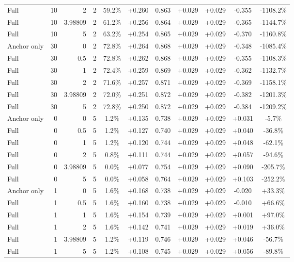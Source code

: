 \begin{table}[htbp]
\begin{tabular}{lrrrccccccc}
Full & 10 & 2 & 2 & 59.2\% & +0.260 & 0.863 & +0.029 & +0.029 & -0.355 & -1108.2\% \\
Full & 10 & 3.98809 & 2 & 61.2\% & +0.256 & 0.864 & +0.029 & +0.029 & -0.365 & -1144.7\% \\
Full & 10 & 5 & 2 & 63.2\% & +0.254 & 0.865 & +0.029 & +0.029 & -0.370 & -1160.8\% \\
Anchor only & 30 & 0 & 2 & 72.8\% & +0.264 & 0.868 & +0.029 & +0.029 & -0.348 & -1085.4\% \\
Full & 30 & 0.5 & 2 & 72.8\% & +0.262 & 0.868 & +0.029 & +0.029 & -0.355 & -1108.3\% \\
Full & 30 & 1 & 2 & 72.4\% & +0.259 & 0.869 & +0.029 & +0.029 & -0.362 & -1132.7\% \\
Full & 30 & 2 & 2 & 71.6\% & +0.257 & 0.871 & +0.029 & +0.029 & -0.369 & -1158.1\% \\
Full & 30 & 3.98809 & 2 & 72.0\% & +0.251 & 0.872 & +0.029 & +0.029 & -0.382 & -1201.3\% \\
Full & 30 & 5 & 2 & 72.8\% & +0.250 & 0.872 & +0.029 & +0.029 & -0.384 & -1209.2\% \\
Anchor only & 0 & 0 & 5 & 1.2\% & +0.135 & 0.738 & +0.029 & +0.029 & +0.031 & -5.7\% \\
Full & 0 & 0.5 & 5 & 1.2\% & +0.127 & 0.740 & +0.029 & +0.029 & +0.040 & -36.8\% \\
Full & 0 & 1 & 5 & 1.2\% & +0.120 & 0.744 & +0.029 & +0.029 & +0.048 & -62.1\% \\
Full & 0 & 2 & 5 & 0.8\% & +0.111 & 0.744 & +0.029 & +0.029 & +0.057 & -94.6\% \\
Full & 0 & 3.98809 & 5 & 0.0\% & +0.077 & 0.754 & +0.029 & +0.029 & +0.090 & -205.7\% \\
Full & 0 & 5 & 5 & 0.0\% & +0.058 & 0.764 & +0.029 & +0.029 & +0.103 & -252.2\% \\
Anchor only & 1 & 0 & 5 & 1.6\% & +0.168 & 0.738 & +0.029 & +0.029 & -0.020 & +33.3\% \\
Full & 1 & 0.5 & 5 & 1.6\% & +0.160 & 0.738 & +0.029 & +0.029 & -0.010 & +66.6\% \\
Full & 1 & 1 & 5 & 1.6\% & +0.154 & 0.739 & +0.029 & +0.029 & +0.001 & +97.0\% \\
Full & 1 & 2 & 5 & 1.6\% & +0.142 & 0.741 & +0.029 & +0.029 & +0.019 & +36.0\% \\
Full & 1 & 3.98809 & 5 & 1.2\% & +0.119 & 0.746 & +0.029 & +0.029 & +0.046 & -56.7\% \\
Full & 1 & 5 & 5 & 1.2\% & +0.108 & 0.745 & +0.029 & +0.029 & +0.056 & -89.8\% \\

\end{tabular}
\end{table}
